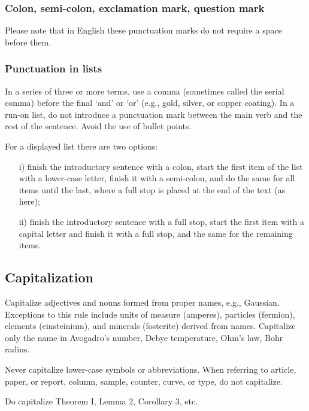 \documentclass{cernphprep}
\makeatletter
\providecommand*\eg{e.g.,\xspace}
\providecommand*\etc{etc.\@\xspace}
\makeatother
\begin{document}
\subsubsection{Colon, semi-colon, exclamation mark, question mark}

Please note that in English these punctuation marks do not require a
space before them.

\subsubsection{Punctuation in lists}

In a series of three or more terms, use a comma (sometimes called the
serial comma) before the final `and' or `or' (\eg gold, silver, or
copper coating). In a run-on list, do not introduce a punctuation mark
between the main verb and the rest of the sentence.  Avoid the use of
bullet points.

For a displayed list there are two options:

\begin{itemize}
\item[i)]  finish the introductory sentence with a colon, start the
           first item of the list with a lower-case letter, finish it
           with a semi-colon, and do the same for all items until the
           last, where a full stop is placed at the end of the text
           (as here);
\item[ii)] finish the introductory sentence with a full stop, start
           the first item with a capital letter and finish it with a
           full stop, and the same for the remaining items.
\end{itemize}

\subsection{Capitalization}

Capitalize adjectives and nouns formed from proper names,
\eg Gaussian.  Exceptions to this rule include units of measure
(amperes), particles (fermion), elements (einsteinium), and minerals
(fosterite) derived from names.  Capitalize only the name in
Avogadro's number, Debye temperature, Ohm's law, Bohr radius.

Never capitalize lower-case symbols or abbreviations. When referring
to article, paper, or report, column, sample, counter, curve, or type,
do not capitalize.

Do capitalize Theorem I, Lemma 2, Corollary 3, \etc
\end{document}
